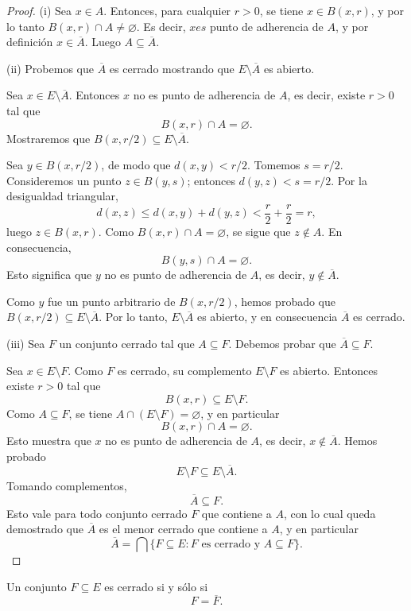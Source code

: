 \begin{proof}
(i) Sea $x \in A$. Entonces, para cualquier $r>0$, se tiene
$x \in B(x,r)$, y por lo tanto $B(x,r) \cap A \ne \varnothing$.
Es decir, $x es$ punto de adherencia de $A$, y por definición
$x \in \overline{A}$. Luego $A \subseteq \overline{A}$.

\medskip

(ii) Probemos que $\overline{A}$ es cerrado mostrando que
$E \setminus \overline{A}$ es abierto.

Sea $x \in E \setminus \overline{A}$. Entonces $x$ no es punto
de adherencia de $A$, es decir, existe $r>0$ tal que
\[
B(x,r) \cap A = \varnothing.
\]
Mostraremos que $B(x,r/2) \subseteq E \setminus \overline{A}$.

Sea $y \in B(x,r/2)$, de modo que $d(x,y) < r/2$.
Tomemos $s = r/2$. Consideremos un punto $z \in B(y,s)$;
entonces $d(y,z) < s = r/2$. Por la desigualdad triangular,
\[
d(x,z) \le d(x,y) + d(y,z) < \frac{r}{2} + \frac{r}{2} = r,
\]
luego $z \in B(x,r)$. Como $B(x,r) \cap A = \varnothing$,
se sigue que $z \notin A$. En consecuencia,
\[
B(y,s) \cap A = \varnothing.
\]
Esto significa que $y$ no es punto de adherencia de $A$,
es decir, $y \notin \overline{A}$.

Como $y$ fue un punto arbitrario de $B(x,r/2)$, hemos probado
que $B(x,r/2) \subseteq E \setminus \overline{A}$. Por lo tanto,
$E \setminus \overline{A}$ es abierto, y en consecuencia
$\overline{A}$ es cerrado.

\medskip

(iii) Sea $F$ un conjunto cerrado tal que $A \subseteq F$.
Debemos probar que $\overline{A} \subseteq F$.

Sea $x \in E \setminus F$. Como $F$ es cerrado, su complemento
$E \setminus F$ es abierto. Entonces existe $r>0$ tal que
\[
B(x,r) \subseteq E \setminus F.
\]
Como $A \subseteq F$, se tiene $A \cap (E \setminus F) = \varnothing$,
y en particular
\[
B(x,r) \cap A = \varnothing.
\]
Esto muestra que $x$ no es punto de adherencia de $A$, es decir,
$x \notin \overline{A}$. Hemos probado
\[
E \setminus F \subseteq E \setminus \overline{A}.
\]
Tomando complementos,
\[
\overline{A} \subseteq F.
\]
Esto vale para todo conjunto cerrado $F$ que contiene a $A$, con lo cual
queda demostrado que $\overline{A}$ es el menor cerrado que contiene a $A$,
y en particular
\[
\overline{A} = \bigcap\{F \subseteq E : F \text{ es cerrado y } A \subseteq F\}.
\]
\end{proof}

\begin{prop}
Un conjunto $F \subseteq E$ es cerrado si y sólo si
\[
F = \overline{F}.
\]
\end{prop}

